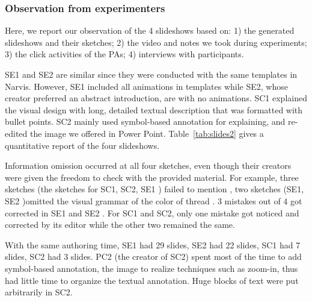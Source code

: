 \subsubsection{Observation from experimenters}

Here, we report our observation of the 4 slideshows based on: 1) the generated slideshows and their sketches; 2) the video and notes we took during experiments; 3) the click activities of the PAs; 4) interviews with participants.

SE1 and SE2 are similar since they were conducted with the same templates in Narvis. However, SE1 included all animations in templates while SE2, whose creator preferred an abstract introduction, are with no animations. 
SC1 explained the visual design with long, detailed textual description that was formatted with bullet points. SC2 mainly used symbol-based annotation for explaining, and re-edited the image we offered in Power Point. Table~\ref{tab:slides2} gives a quantitative report of the four slideshows.

Information omission  occurred at all four sketches, even though their creators were given the freedom to check with the provided material. For example, three sketches (the sketches for SC1, SC2, SE1  ) failed to mention  , two sketches (SE1, SE2 )omitted the visual grammar of the color of thread . 3 mistakes out of 4 got corrected in SE1 and SE2 .   
For SC1 and SC2, only one mistake got noticed and corrected by its editor while the other two remained the same. 

With the same authoring time, SE1 had 29 slides, SE2 had 22 slides, SC1 had 7 slides, SC2 had 3 slides. PC2 (the creator of SC2) spent most of the time to add symbol-based annotation,   the image to realize techniques such as zoom-in, thus had little time to organize the textual annotation. Huge blocks of text were put arbitrarily in SC2.

